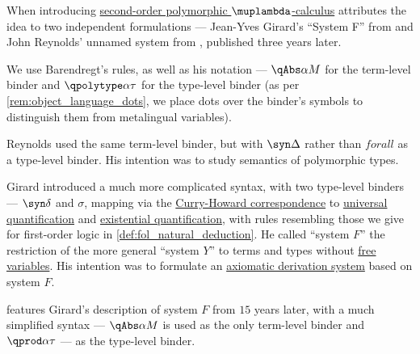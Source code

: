 \begin{remark}\label{rem:polymorphic_type_origin}
  When introducing \hyperref[def:polymorphic_typed_lambda_calculus]{second-order polymorphic \( \muplambda \)-calculus} \textcite[def. 5.1.3]{Barendregt1992LambdaCalculiWithTypes} attributes the idea to two independent formulations --- Jean-Yves Girard's \enquote{System F} from \cite{Girard1971SystèmeF} and John Reynolds' unnamed system from \cite{Reynolds1974TheoryOfTypeStructure}, published three years later.

  We use Barendregt's rules, as well as his notation --- \( \qAbs \alpha M \) for the term-level binder and \( \qpolytype \alpha \tau \) for the type-level binder (as per \cref{rem:object_language_dots}, we place dots over the binder's symbols to distinguish them from metalingual variables).

  Reynolds used the same term-level binder, but with \( \syn\Delta \) rather than \( forall \) as a type-level binder. His intention was to study semantics of polymorphic types.

  Girard introduced a much more complicated syntax, with two type-level binders --- \( \syn\delta \) and \( \sigma \), mapping via the \hyperref[con:curry_howard_correspondence]{Curry-Howard correspondence} to \hyperref[def:predicate_logic_alphabet/quantifiers/universal]{universal quantification} and \hyperref[def:predicate_logic_alphabet/quantifiers/existential]{existential quantification}, with rules resembling those we give for first-order logic in \cref{def:fol_natural_deduction}. He called \enquote{system \( F \)} the restriction of the more general \enquote{system \( Y \)} to terms and types without \hyperref[con:variable_binding]{free variables}. His intention was to formulate an \hyperref[def:propositional_axiomatic_derivation_system]{axiomatic derivation system} based on system \( F \).

  \cite[ch. 11]{GirardEtAl1989ProofsAndTypes} features Girard's description of system \( F \) from \( 15 \) years later, with a much simplified syntax --- \( \qAbs \alpha M \) is used as the only term-level binder and \( \qprod \alpha \tau \) --- as the type-level binder.
\end{remark}

